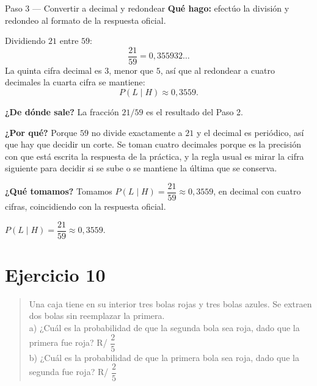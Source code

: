 \documentclass[11pt]{article}
\begin{document}
\begin{paso}{Paso 3 --- Convertir a decimal y redondear}
\textbf{Qué hago:} efectúo la división y redondeo al formato de la respuesta oficial.

Dividiendo $21$ entre $59$:
\[
\frac{21}{59}=0{,}355932\ldots
\]
La quinta cifra decimal es $3$, menor que $5$, así que al redondear a cuatro decimales la cuarta cifra se mantiene:
\[
P(L\mid H)\approx 0{,}3559.
\]

\textbf{¿De dónde sale?} La fracción $21/59$ es el resultado del Paso 2.

\textbf{¿Por qué?} Porque $59$ no divide exactamente a $21$ y el decimal es periódico, así que hay que decidir un corte. Se toman cuatro decimales porque es la precisión con que está escrita la respuesta de la práctica, y la regla usual es mirar la cifra siguiente para decidir si se sube o se mantiene la última que se conserva.

\textbf{¿Qué tomamos?} Tomamos $P(L\mid H)=\dfrac{21}{59}\approx 0{,}3559$, en decimal con cuatro cifras, coincidiendo con la respuesta oficial.
\end{paso}

\begin{resp}
$P(L\mid H)=\dfrac{21}{59}\approx 0{,}3559$.
\end{resp}

\section*{Ejercicio 10}

\begin{quote}
Una caja tiene en su interior tres bolas rojas y tres bolas azules. Se extraen dos bolas sin reemplazar la primera.\\
a) ¿Cuál es la probabilidad de que la segunda bola sea roja, dado que la primera fue roja? \hfill R/ $\dfrac{2}{5}$\\
b) ¿Cuál es la probabilidad de que la primera bola sea roja, dado que la segunda fue roja? \hfill R/ $\dfrac{2}{5}$
\end{quote}
\end{document}
